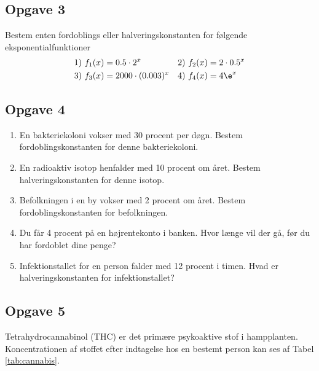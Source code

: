 \subsection*{Opgave 3}
Bestem enten fordoblings eller halveringskonstanten for følgende eksponentialfunktioner
\begin{align*}
&1) \ f_1(x) = 0.5\cdot 2^x   &&2) \ f_2(x)=2\cdot 0.5^x  \\
&3) \ f_3(x) = 2000\cdot(0.003)^x  &&4) \ f_4(x) = 4\e^x  \\
\end{align*}

\subsection*{Opgave 4}

\begin{enumerate}[label=\roman*)]
	\item En bakteriekoloni vokser med 30 procent per døgn. Bestem fordoblingskonstanten for denne bakteriekoloni.
	\item En radioaktiv isotop henfalder med 10 procent om året. Bestem halveringskonstanten for denne isotop.
	\item Befolkningen i en by vokser med 2 procent om året. Bestem fordoblingskonstanten for befolkningen. 
	\item Du får 4 procent på en højrentekonto i banken. Hvor længe vil der gå, før du har fordoblet dine penge?
	\item Infektionstallet for en person falder med 12 procent i timen. Hvad er halveringskonstanten for infektionstallet?
\end{enumerate}
\newpage
\subsection*{Opgave 5}
Tetrahydrocannabinol (THC) er det primære psykoaktive stof i hampplanten. Koncentrationen af stoffet efter indtagelse hos en bestemt person kan ses af Tabel \ref{tab:cannabis}.

